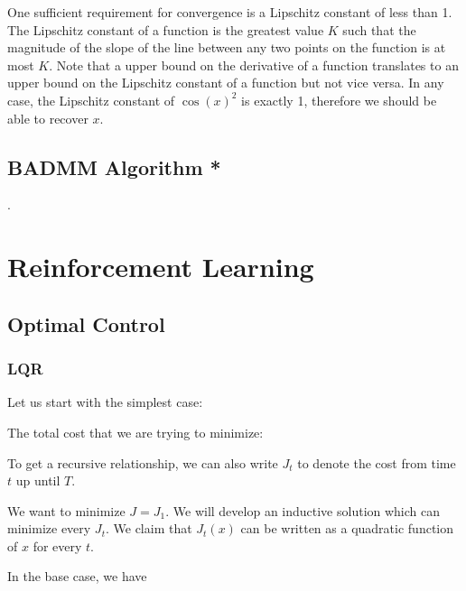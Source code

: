 \documentclass[12pt]{article}
\begin{document}
One sufficient requirement for convergence is a Lipschitz constant of less than 1. The Lipschitz constant of a function is the greatest value $K$ such that the magnitude of the slope of the line between any two points on the function is at most $K$. Note that a upper bound on the derivative of a function translates to an upper bound on the Lipschitz constant of a function but not vice versa. In any case, the Lipschitz constant of $\cos(x)^2$ is exactly 1, therefore we should be able to recover $x$.

\subsection{BADMM Algorithm *}
.
\section{Reinforcement Learning}

\subsection{Optimal Control}

\subsubsection{LQR}

Let us start with the simplest case:


The total cost that we are trying to minimize:


To get a recursive relationship, we can also write $J_t$ to denote the cost from time $t$ up until $T$. 


We want to minimize $J = J_1$. We will develop an inductive solution which can minimize every $J_t$. We claim that $J_{t}(x)$ can be written as a quadratic function of $x$ for every $t$. 

In the base case, we have 
\end{document}
